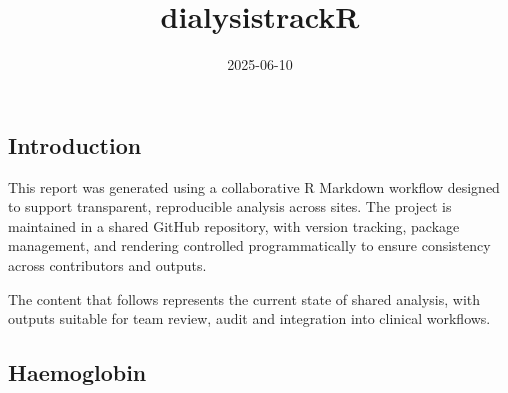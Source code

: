 \documentclass[
]{article}
\title{dialysistrackR}
\author{}
\date{\vspace{-2.5em}2025-06-10}
\begin{document}
\maketitle

\subsection{Introduction}\label{introduction}

This report was generated using a collaborative R Markdown workflow
designed to support transparent, reproducible analysis across sites. The
project is maintained in a shared GitHub repository, with version
tracking, package management, and rendering controlled programmatically
to ensure consistency across contributors and outputs.

The content that follows represents the current state of shared
analysis, with outputs suitable for team review, audit and integration
into clinical workflows.

\subsection{Haemoglobin}\label{haemoglobin}
\end{document}
